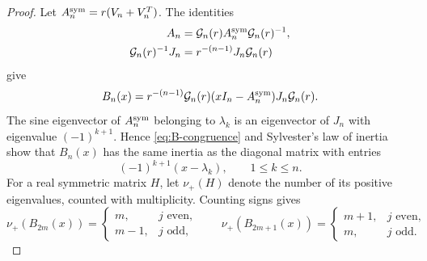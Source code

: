 \documentclass[11pt,a4paper]{article}
\numberwithin{equation}{section}
\begin{document}
\begin{proof}
Let \(A_n^{\rm sym}=r(V_n+V_n^T)\).  The identities
\[
 \begin{aligned}
 A_n&=\mathcal G_n(r)A_n^{\rm sym}\mathcal G_n(r)^{-1},\\
 \mathcal G_n(r)^{-1}J_n
 &=r^{-(n-1)}J_n\mathcal G_n(r)
 \end{aligned}
\]
give
\begin{equation}\label{eq:B-congruence}
 B_n(x)=r^{-(n-1)}\mathcal G_n(r)(xI_n-A_n^{\rm sym})
 J_n\mathcal G_n(r).
\end{equation}
The sine eigenvector of \(A_n^{\rm sym}\) belonging to \(\lambda_k\) is an
eigenvector of \(J_n\) with eigenvalue \((-1)^{k+1}\).  Hence
\eqref{eq:B-congruence} and Sylvester's law of inertia show that
\(B_n(x)\) has the same inertia as the diagonal matrix with entries
\[
 (-1)^{k+1}(x-\lambda_k),\qquad 1\leq k\leq n.
\]
For a real symmetric matrix \(H\), let \(\nu_+(H)\) denote the number of its
positive eigenvalues, counted with multiplicity.  Counting signs gives
\begin{equation}\label{eq:middle-inertia}
 \nu_+(B_{2m}(x))=
 \begin{cases}m,&j\text{ even},\\m-1,&j\text{ odd},\end{cases}
 \qquad
 \nu_+(B_{2m+1}(x))=
 \begin{cases}m+1,&j\text{ even},\\m,&j\text{ odd}.
 \end{cases}
\end{equation}


\end{proof}
\end{document}
